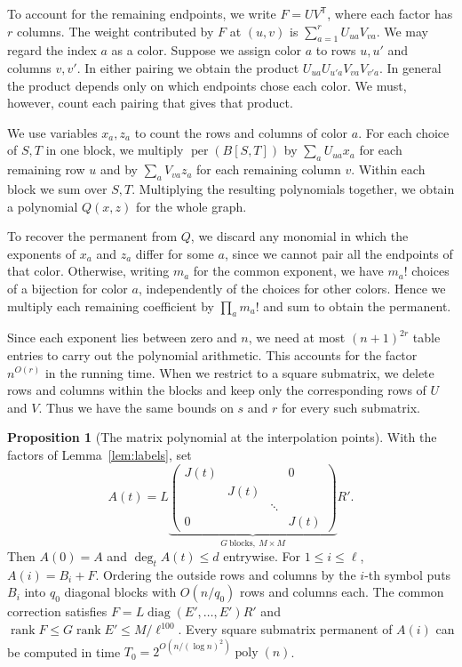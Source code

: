 \documentclass{article}
\theoremstyle{definition}
\newtheorem{proposition}[theorem]{Proposition}
\DeclareMathOperator{\per}{per}
\DeclareMathOperator{\rank}{rank}
\DeclareMathOperator{\diag}{diag}
\begin{document}
To account for the remaining endpoints, we write \(F=UV^{\mathsf T}\),
where each factor has \(r\) columns. The weight contributed by \(F\)
at \((u,v)\) is \(\sum_{a=1}^r U_{ua}V_{va}\). We may regard the
index \(a\) as a color. Suppose we assign color \(a\) to rows \(u,u'\) and columns
\(v,v'\). In either pairing we obtain the
product \(U_{ua}U_{u'a}V_{va}V_{v'a}\). In general the product depends
only on which endpoints chose each color. We must, however, count each
pairing that gives that product.

We use variables \(x_a,z_a\) to count the rows and columns of color
\(a\). For each choice of \(S,T\) in one block, we multiply
\(\per(B[S,T])\) by \(\sum_a U_{ua}x_a\) for each remaining row \(u\)
and by \(\sum_a V_{va}z_a\) for each remaining column \(v\).
Within each block we sum over \(S,T\). Multiplying the resulting
polynomials together, we obtain a polynomial \(Q(x,z)\) for the whole graph.

To recover the permanent from \(Q\), we discard any monomial in
which the exponents of \(x_a\) and \(z_a\) differ for some \(a\),
since we cannot pair all the endpoints of that color. Otherwise, writing
\(m_a\) for the common exponent, we have \(m_a!\) choices of a bijection
for color \(a\), independently of the choices for other colors.
Hence we multiply each remaining coefficient by
\(\prod_a m_a!\) and sum to obtain the permanent.

Since each exponent lies between zero and \(n\), we need at most
\((n+1)^{2r}\) table entries to carry out the polynomial arithmetic.
This accounts for the factor \(n^{O(r)}\) in the running time. When we
restrict to a square submatrix, we delete rows and columns within the
blocks and keep only the corresponding rows of \(U\) and \(V\).
Thus we have the same bounds on \(s\) and \(r\) for every such
submatrix.

\begin{proposition}[The matrix polynomial at the interpolation points]\label{prop:easy}
With the factors of Lemma~\ref{lem:labels}, set
\[
    A(t)=L\underbrace{\begin{pmatrix}
        J(t) &      &        & 0\\
             & J(t) &        &  \\
             &      & \ddots &  \\
        0    &      &        & J(t)
    \end{pmatrix}}_{G\ \mathrm{blocks},\ M\times M}R'.
\]
Then \(A(0)=A\) and \(\deg_t A(t)\le d\) entrywise.
For \(1\le i\le\ell\), \(A(i)=B_i+F\). Ordering the outside rows and
columns by the \(i\)-th symbol puts \(B_i\) into \(q_0\) diagonal blocks
with \(O(n/q_0)\) rows and columns each. The common correction satisfies
\(F=L\diag(E',\ldots,E')R'\) and \(\rank F\le G\rank E'\le M/\ell^{100}\).
Every square submatrix permanent of \(A(i)\) can be computed in time
\(T_0=2^{O(n/(\log n)^2)}\operatorname{poly}(n)\).
\end{proposition}
\end{document}
